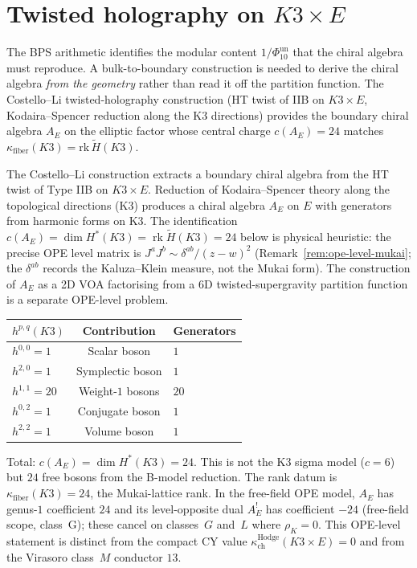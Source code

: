 \section{Twisted holography on \texorpdfstring{$K3 \times E$}{K3 x E}}
\label{sec:twisted-holography-k3xe}

The BPS arithmetic identifies the modular content \(1/\Phi_{10}^{\mathrm{un}}\)
that the chiral algebra must reproduce. A bulk-to-boundary
construction is needed to derive the chiral algebra
\emph{from the geometry} rather than read it off the partition
function. The Costello--Li twisted-holography construction
\textup{(}HT twist of IIB on $K3 \times E$, Kodaira--Spencer
reduction along the K3 directions\textup{)} provides the
boundary chiral algebra $A_E$ on the elliptic factor whose
central charge $c(A_E) = 24$ matches $\kappa_{\mathrm{fiber}}(K3)
= \mathrm{rk}\,\widetilde{H}(K3)$.

\begin{construction}
\label{constr:costello-li-k3xe}
The Costello--Li construction extracts a boundary chiral algebra from
the HT twist of Type IIB on $K3 \times E$. Reduction of
Kodaira--Spencer theory along the topological directions (K3)
produces a chiral algebra $A_E$ on $E$ with generators from
harmonic forms on K3. The identification
$c(A_E) = \dim H^*(K3) = \operatorname{rk}\widetilde H(K3) = 24$
below is physical heuristic: the precise OPE level matrix is
$J^a J^b \sim \delta^{ab}/(z-w)^2$ (Remark~\ref{rem:ope-level-mukai};
the $\delta^{ab}$ records the Kaluza--Klein measure, not the Mukai
form). The construction of \(A_E\) as a 2D VOA factorising from a
6D twisted-supergravity partition function is a separate OPE-level
problem.
\begin{center}
\small
\renewcommand{\arraystretch}{1.2}
\begin{tabular}{lcl}
$h^{p,q}(K3)$ & Contribution & Generators \\
\hline
$h^{0,0} = 1$ & Scalar boson & $1$ \\
$h^{2,0} = 1$ & Symplectic boson & $1$ \\
$h^{1,1} = 20$ & Weight-$1$ bosons & $20$ \\
$h^{0,2} = 1$ & Conjugate boson & $1$ \\
$h^{2,2} = 1$ & Volume boson & $1$
\end{tabular}
\end{center}
Total: $c(A_E) = \dim H^*(K3) = 24$. This is not the K3 sigma model
($c = 6$) but $24$ free bosons from the B-model reduction.
The rank datum is $\kappa_{\mathrm{fiber}}(K3)=24$, the Mukai-lattice
rank. In the free-field OPE model, $A_E$ has genus-$1$ coefficient
$24$ and its level-opposite dual $A_E^!$ has coefficient $-24$
\textup{(}free-field scope, class~G\textup{)}; these cancel on
classes~$G$ and~$L$ where $\rho_K = 0$. This OPE-level statement is
distinct from the compact CY value
$\kappa_{\mathrm{ch}}^{\mathrm{Hodge}}(K3\times E)=0$ and from the
Virasoro class~$M$ conductor $13$.
\end{construction}

